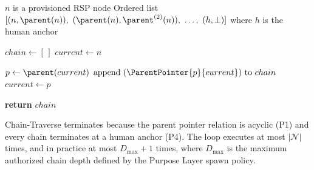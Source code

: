 \begin{algorithm}
\caption{Chain-Traverse($n$) — Compute the authorization chain from node $n$ to human anchor}
\label{alg:chain-traverse}
\begin{algorithmic}[1]
\REQUIRE $n$ is a provisioned RSP node
\ENSURE Ordered list $[(n, \parent(n)),\ (\parent(n), \parent^{(2)}(n)),\ \ldots,\ (h, \bot)]$ where $h$ is the human anchor

\STATE $chain \leftarrow [\,]$
\STATE $current \leftarrow n$

    \STATE $p \leftarrow \parent(current)$
    \STATE $\text{append } (\ParentPointer{p}{current}) \text{ to } chain$
    \STATE $current \leftarrow p$
\ENDWHILE

\STATE \textbf{return} $chain$
\end{algorithmic}
\end{algorithm}

Chain-Traverse terminates because the parent pointer relation is acyclic (P1) and every chain terminates at a human anchor (P4). The loop executes at most $|\mathcal{N}|$ times, and in practice at most $D_{\max} + 1$ times, where $D_{\max}$ is the maximum authorized chain depth defined by the Purpose Layer spawn policy.


